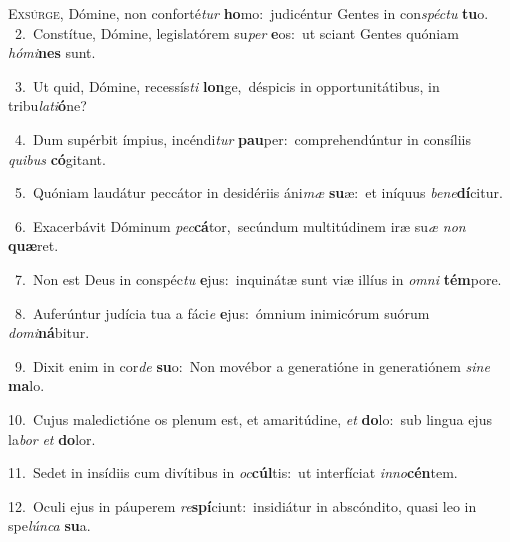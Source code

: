 \lettrine{\initial\textcolor{\initialcolor}{E}}{xsúrge,} Dómine, non conforté\textit{tur} \textbf{ho}\-mo:~\star judicéntur Gentes in con\-\textit{spéc}\-\textit{tu} \textbf{tu}\-o.\\
{\numbfont\textcolor{\numbcolor}{~2.}}~Constítue, Dómine, legislatórem su\textit{per} \textbf{e}\-os:~\star ut sciant Gentes quóniam \textit{hó}\-\textit{mi}\textbf{nes} sunt.\par
{\numbfont\textcolor{\numbcolor}{~3.}}~Ut quid, Dómine, recessís\textit{ti} \textbf{lon}\-ge,~\star déspicis in opportunitátibus, in tribu\-\textit{la}\-\textit{ti}\textbf{ó}ne?\par
{\numbfont\textcolor{\numbcolor}{~4.}}~Dum supérbit ímpius, incéndi\textit{tur} \textbf{pau}\-per:~\star comprehendúntur in consíliis \textit{qui}\-\textit{bus} \textbf{có}\-gitant.\par
{\numbfont\textcolor{\numbcolor}{~5.}}~Quóniam laudátur peccátor in desidériis áni\textit{mæ} \textbf{su}\-æ:~\star et iníquus \textit{be}\-\textit{ne}\textbf{dí}citur.\par
{\numbfont\textcolor{\numbcolor}{~6.}}~Exacerbávit Dóminum \textit{pec}\-\textbf{cá}tor,~\star secúndum multitúdinem iræ su\textit{æ} \textit{non} \textbf{quæ}\-ret.\par
{\numbfont\textcolor{\numbcolor}{~7.}}~Non est Deus in conspéc\textit{tu} \textbf{e}\-jus:~\star inquinátæ sunt viæ illíus in \textit{om}\-\textit{ni} \textbf{tém}\-pore.\par
{\numbfont\textcolor{\numbcolor}{~8.}}~Auferúntur judícia tua a fáci\textit{e} \textbf{e}\-jus:~\star ómnium inimicórum suórum \textit{do}\-\textit{mi}\textbf{ná}bitur.\par
{\numbfont\textcolor{\numbcolor}{~9.}}~Dixit enim in cor\textit{de} \textbf{su}\-o:~\star Non movébor a generatióne in generatiónem \textit{si}\-\textit{ne} \textbf{ma}\-lo.\par
{\numbfont\textcolor{\numbcolor}{10.}}~Cujus maledictióne os plenum est, et amaritúdine, \textit{et} \textbf{do}\-lo:~\star sub lingua ejus la\textit{bor} \textit{et} \textbf{do}\-lor.\par
{\numbfont\textcolor{\numbcolor}{11.}}~Sedet in insídiis cum divítibus in \textit{oc}\-\textbf{cúl}tis:~\star ut interfíciat \textit{in}\-\textit{no}\textbf{cén}tem.\par
{\numbfont\textcolor{\numbcolor}{12.}}~Oculi ejus in páuperem \textit{re}\-\textbf{spí}ciunt:~\star insidiátur in abscóndito, quasi leo in spe\-\textit{lún}\-\textit{ca} \textbf{su}\-a.\par
